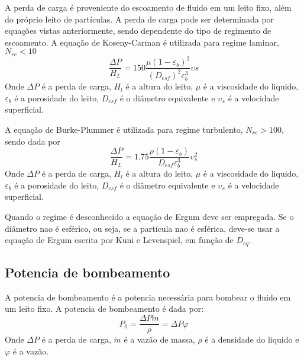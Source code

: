 A perda de carga é proveniente do escoamento de fluido em um leito fixo, além do próprio leito de
partículas. A perda de carga pode ser determinada por equações vistas anteriormente, sendo
dependente do tipo de regimento de escoamento. A equação de Koseny-Carman é utilizada para regime
laminar, \(N_{re} < 10 \)
\begin{equation}
    \frac{\Delta P}{H_{L}} = 150 \frac{\mu \left( 1 - \varepsilon _{b}  \right) ^{2}}{\left( D_{esf}  \right) ^{2} \varepsilon _{b} ^{3} } \upsilon s
\end{equation} 
Onde \(\Delta P\) é a perda de carga, \(H_{l}\) é a altura do leito, \(\mu \) é a viscosidade do
liquido, \(\varepsilon _{b} \) é a porosidade do leito, \(D_{esf} \) é o diâmetro equivalente e
\(\upsilon _{s} \) é a velocidade superficial. \par

A equação de Burke-Plummer é utilizada para regime turbulento, \(N_{re} > 100 \), sendo dada por
\begin{equation}
    \frac{\Delta P}{H_{L}} = 1.75 \frac{\rho \left( 1 - \varepsilon _{b}  \right) }{D_{esf} \varepsilon _{b} ^{3}  }\upsilon _{s} ^{2}
\end{equation}
Onde \(\Delta P\) é a perda de carga, \(H_{l}\) é a altura do leito, \(\mu \) é a viscosidade do
liquido, \(\varepsilon _{b} \) é a porosidade do leito, \(D_{esf} \) é o diâmetro equivalente e
\(\upsilon _{s} \) é a velocidade superficial. \par

Quando o regime é desconhecido a equação de Ergum deve ser empregada. Se o diâmetro nao é esférico,
ou seja, se a partícula nao é esférica, deve-se usar a equação de Ergum escrita por Kuni e
Levenspiel, em função de \(D_{eq} \). \par

\subsection{Potencia de bombeamento}
A potencia de bombeamento é a potencia necessária para bombear o fluido em um leito fixo. A potencia
de bombeamento é dada por:
\begin{equation}
    P_0 = \frac{\Delta P \dot{m}}{\rho } = {\Delta P \varphi}
\end{equation}
Onde \(\Delta P\) é a perda de carga, \(\dot{m}\) é a vazão de massa, \(\rho \) é a densidade do
liquido e \(\varphi \) é a vazão.
